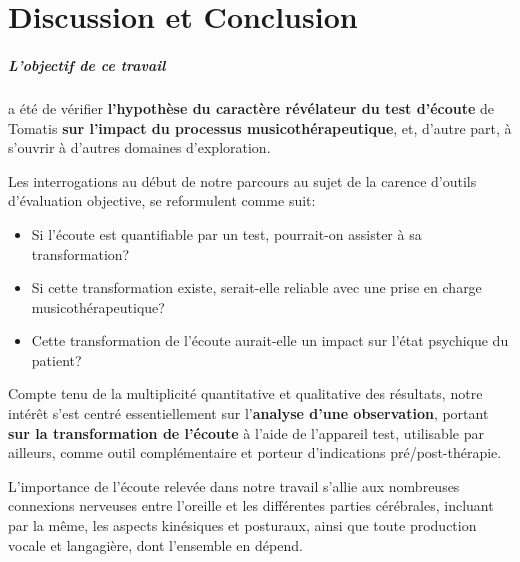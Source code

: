
\chapter{Discussion et Conclusion}
\label{Conclusions}


\paragraph{L'objectif de ce travail} a été de vérifier\textbf{ l'hypothèse du caractère
révélateur du test
d'écoute }de Tomatis \textbf{ sur l'impact du processus musicothérapeutique},
et, d'autre part, à s'ouvrir à d'autres
domaines d'exploration.

Les interrogations au début de notre parcours au
sujet de la carence d'outils d'évaluation objective, se 
reformulent comme suit:
\begin{itemize}
     \item 
       Si l'écoute est quantifiable  par un test, pourrait-on assister à sa
transformation?
\item Si cette transformation existe, serait-elle reliable avec
une prise en charge musicothérapeutique?
\item Cette transformation de l'écoute aurait-elle un impact sur l'état
psychique du patient? %
\end{itemize}



  Compte tenu de la multiplicité quantitative et qualitative des
  résultats, notre intérêt s'est centré essentiellement sur l'\textbf{analyse d'une
  observation}, portant \textbf{sur la transformation de l'écoute} à l'aide de
  l'appareil test, utilisable par ailleurs, comme outil complémentaire
  et porteur d'indications pré/post-thérapie.
 

  
 
L'importance de l'écoute relevée dans notre travail
s'allie aux nombreuses connexions nerveuses entre l'oreille et les
différentes parties cérébrales, incluant par la même, les aspects kinésiques
et posturaux, ainsi que toute production vocale et langagière,
dont l'ensemble en dépend.




